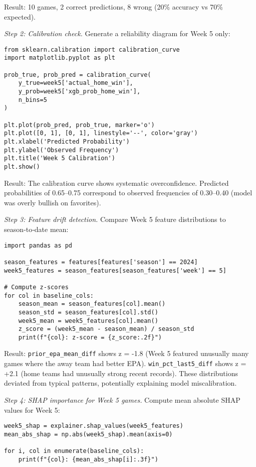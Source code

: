 Result: 10 games, 2 correct predictions, 8 wrong (20\% accuracy vs 70\% expected).

\textit{Step 2: Calibration check.}
Generate a reliability diagram for Week 5 only:
\begin{verbatim}
from sklearn.calibration import calibration_curve
import matplotlib.pyplot as plt

prob_true, prob_pred = calibration_curve(
    y_true=week5['actual_home_win'],
    y_prob=week5['xgb_prob_home_win'],
    n_bins=5
)

plt.plot(prob_pred, prob_true, marker='o')
plt.plot([0, 1], [0, 1], linestyle='--', color='gray')
plt.xlabel('Predicted Probability')
plt.ylabel('Observed Frequency')
plt.title('Week 5 Calibration')
plt.show()
\end{verbatim}

Result: The calibration curve shows systematic overconfidence. Predicted probabilities of 0.65--0.75 correspond to observed frequencies of 0.30--0.40 (model was overly bullish on favorites).

\textit{Step 3: Feature drift detection.}
Compare Week 5 feature distributions to season‑to‑date mean:
\begin{verbatim}
import pandas as pd

season_features = features[features['season'] == 2024]
week5_features = season_features[season_features['week'] == 5]

# Compute z-scores
for col in baseline_cols:
    season_mean = season_features[col].mean()
    season_std = season_features[col].std()
    week5_mean = week5_features[col].mean()
    z_score = (week5_mean - season_mean) / season_std
    print(f"{col}: z-score = {z_score:.2f}")
\end{verbatim}

Result: \texttt{prior\_epa\_mean\_diff} shows z = -1.8 (Week 5 featured unusually many games where the away team had better EPA). \texttt{win\_pct\_last5\_diff} shows z = +2.1 (home teams had unusually strong recent records). These distributions deviated from typical patterns, potentially explaining model miscalibration.

\textit{Step 4: SHAP importance for Week 5 games.}
Compute mean absolute SHAP values for Week 5:
\begin{verbatim}
week5_shap = explainer.shap_values(week5_features)
mean_abs_shap = np.abs(week5_shap).mean(axis=0)

for i, col in enumerate(baseline_cols):
    print(f"{col}: {mean_abs_shap[i]:.3f}")
\end{verbatim}

